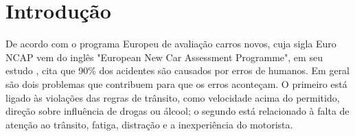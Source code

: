 \documentclass[
	12pt,				%
    oneside,			%
	a4paper,			%
	english,			%
	french,				%
	spanish,			%
	brazil,				%
	]{abntex2}
\begin{document}






\tableofcontents*


\textual


\chapter{Introdução} %

De acordo com o programa Europeu de avaliação carros novos, cuja sigla Euro NCAP vem do inglês "European New Car Assessment Programme", em seu estudo , cita que 90\% dos acidentes são causados por erros de humanos. Em geral são dois problemas que  contribuem para que os erros aconteçam. O primeiro está ligado às violações das regras de trânsito, como velocidade acima do permitido, direção sobre influência de drogas ou álcool; o segundo está relacionado à falta de atenção ao trânsito, fatiga, distração e a inexperiência do motorista. 
\end{document}
